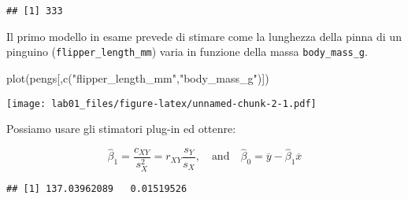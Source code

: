 \documentclass[
]{article}
\newenvironment{Shaded}{\begin{snugshade}}{\end{snugshade}}
\newcommand{\FunctionTok}[1]{\textcolor[rgb]{0.00,0.00,0.00}{#1}}
\newcommand{\NormalTok}[1]{#1}
\newcommand{\OtherTok}[1]{\textcolor[rgb]{0.56,0.35,0.01}{#1}}
\newcommand{\SpecialCharTok}[1]{\textcolor[rgb]{0.00,0.00,0.00}{#1}}
\newcommand{\StringTok}[1]{\textcolor[rgb]{0.31,0.60,0.02}{#1}}
\begin{document}
\begin{verbatim}
## [1] 333
\end{verbatim}

Il primo modello in esame prevede di stimare come la lunghezza della
pinna di un pinguino (\texttt{flipper\_length\_mm}) varia in funzione
della massa \texttt{body\_mass\_g}.

\begin{Shaded}
\begin{Highlighting}[]
\FunctionTok{plot}\NormalTok{(pengs[,}\FunctionTok{c}\NormalTok{(}\StringTok{"flipper\_length\_mm"}\NormalTok{,}\StringTok{"body\_mass\_g"}\NormalTok{)])}
\end{Highlighting}
\end{Shaded}

\texttt{[image: lab01\_files/figure-latex/unnamed-chunk-2-1.pdf]}

Possiamo usare gli stimatori plug-in ed ottenre:

\[\hat{\beta}_1 = \frac{c_{XY}}{s^2_{X}} =  r_{XY} \frac{s_{Y}}{s_{X}},\quad \mbox{and} \quad \hat{\beta}_0 = \overline{y}-\hat{\beta}_1 \overline{x}  \]

\begin{Shaded}
\end{Shaded}

\begin{verbatim}
## [1] 137.03962089   0.01519526
\end{verbatim}
\end{document}
